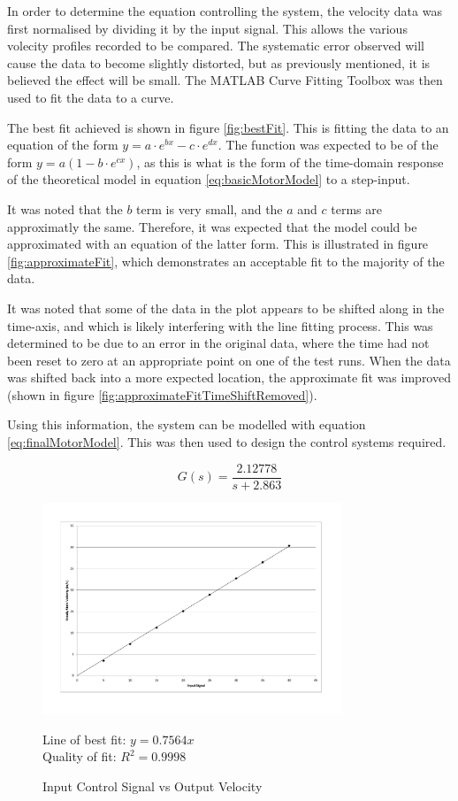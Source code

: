 \documentclass[10pt]{article} \usepackage[a4paper]{geometry}
\begin{document}
In order to determine the equation controlling the system, the velocity data was
first normalised by dividing it by the input signal.  This allows the various
volecity profiles recorded to be compared.  The systematic error observed will
cause the data to become slightly distorted, but as previously mentioned, it is
believed the effect will be small.  The MATLAB Curve Fitting Toolbox was then
used to fit the data to a curve.

The best fit achieved is shown in figure \ref{fig:bestFit}.  This is fitting the
data to an equation of the form $y = a \cdot e^{bx} - c \cdot e^{dx} $.  The
function was expected to be of the form $y = a(1-b \cdot e^{cx})$, as this is
what is the form of the time-domain response of the theoretical model in
equation \ref{eq:basicMotorModel} to a step-input.

It was noted that the $b$ term is very small, and the $a$ and $c$ terms are
approximatly the same.  Therefore, it was expected that the model could be
approximated with an equation of the latter form.  This is illustrated in figure
\ref{fig:approximateFit}, which demonstrates an acceptable fit to the majority
of the data.

It was noted that some of the data in the plot appears to be shifted along in
the time-axis, and which is likely interfering with the line fitting process.
This was determined to be due to an error in the original data, where the time
had not been reset to zero at an appropriate point on one of the test runs.
When the data was shifted back into a more expected location, the approximate
fit was improved (shown in figure \ref{fig:approximateFitTimeShiftRemoved}).

Using this information, the system can be modelled with equation
\ref{eq:finalMotorModel}.  This was then used to design the control systems
required.

\begin{equation}
 \label{eq:finalMotorModel}
 G\left(s\right) = \frac{2.12778}{s+2.863}
\end{equation}

\begin{figure}
 \centering
 \includegraphics[width=0.8\textwidth]{Images/input-signal-vs-output-speed}
 \caption{Input Control Signal vs Output Velocity}
 \label{fig:inputOutputVelocityGraph}
 
 Line of best fit: $y=0.7564x$ \\
 Quality of fit: $R^2 = 0.9998$
\end{figure}
\end{document}
